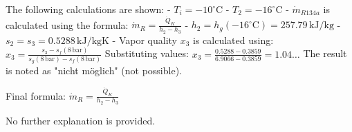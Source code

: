 The following calculations are shown:  
- \( T_i = -10^\circ \text{C} \)  
- \( T_2 = -16^\circ \text{C} \)  
- \( \dot{m}_{R134a} \) is calculated using the formula:  
  \( \dot{m}_R = \frac{\dot{Q}_K}{h_2 - h_3} \)  
- \( h_2 = h_g(-16^\circ \text{C}) = 257.79 \, \text{kJ/kg} \)  
- \( s_2 = s_3 = 0.5288 \, \text{kJ/kgK} \)  
- Vapor quality \( x_3 \) is calculated using:  
  \( x_3 = \frac{s_3 - s_f(8 \, \text{bar})}{s_g(8 \, \text{bar}) - s_f(8 \, \text{bar})} \)  
  Substituting values:  
  \( x_3 = \frac{0.5288 - 0.3859}{6.9066 - 0.3859} = 1.04 \ldots \)  
  The result is noted as "nicht möglich" (not possible).  

Final formula:  
\( \dot{m}_R = \frac{\dot{Q}_K}{h_2 - h_3} \)  

No further explanation is provided.